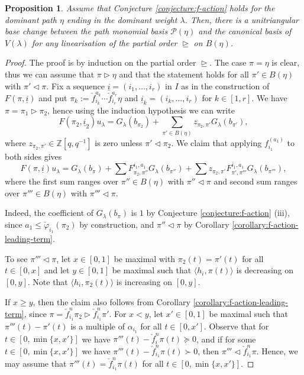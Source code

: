 \documentclass[final]{amsart}
\theoremstyle{plain}
\newtheorem{proposition}[corollary]{Proposition}
\theoremstyle{definition}
\newcommand{\calP}{\mathcal P}
\newcommand{\bbZ}{\mathbb Z}
\newcommand{\uli}{{\underline i}}
\newcommand{\cf}{\check{f}}
\newcommand{\cphi}{\check{\varphi}}
\begin{document}
\begin{proposition}
    \label{proposition:base-change-path-monomial-basis-canonical-basis}
    Assume that Conjecture \ref{conjecture:f-action} holds for the dominant path $\eta$ ending in the dominant weight $\lambda$.
    Then, there is a unitriangular base change between the path monomial basis $\calP(\eta)$ and the canonical basis of $V(\lambda)$ for any linearisation of the partial order $\trianglerighteq$ on $B(\eta)$.
\end{proposition}
\begin{proof}
    The proof is by induction on the partial order $\trianglerighteq$.
    The case $\pi = \eta$ is clear, thus we can assume that $\pi \triangleright \eta$ and that the statement holds for all $\pi' \in B(\eta)$ with $\pi' \triangleleft \pi$.
    Fix a sequence $\uli = (i_1, \dots, i_r)$ in $I$ as in the construction of $F(\pi, \uli)$ and put $\pi_k := \cf_{i_k}^{a_k} \cdots \cf_{i_r}^{a_r} \eta$ and $\uli_k = (i_k, \dots, i_r)$ for $k \in [1, r]$.
    We have $\pi = \pi_1 \triangleright \pi_2$, hence using the induction hypothesis we can write
    \[
        F(\pi_2, \uli_2) u_\lambda = G_\lambda(b_{\pi_2}) + \sum_{\pi' \in B(\eta)} z_{\pi_2, \pi'} G_\lambda(b_{\pi'}),
    \]
    where $z_{\pi_2, \pi'} \in \bbZ[q,q^{-1}]$ is zero unless $\pi' \triangleleft \pi_2$.
    We claim that applying $f_{i_1}^{(a_1)}$ to both sides gives
    \[
        F(\pi, \uli) u_\lambda = G_\lambda(b_\pi) + \sum F_{\pi_2,\pi''}^{i_1,a_1} G_\lambda(b_{\pi''}) + \sum z_{\pi_2, \pi'} F_{\pi',\pi'''}^{i_1,a_1} G_\lambda(b_{\pi'''}),
    \]
    where the first sum ranges over $\pi'' \in B(\eta)$ with $\pi'' \triangleleft \pi$ and second sum ranges over $\pi''' \in B(\eta)$ with $\pi''' \triangleleft \pi$.

    Indeed, the coefficient of $G_\lambda(b_\pi)$ is $1$ by Conjecture \ref{conjecture:f-action} (iii), since $a_1 \le \cphi_{i_1}(\pi_2)$ by construction, and $\pi'' \triangleleft \pi$ by Corollary \ref{corollary:f-action-leading-term}.

    To see $\pi''' \triangleleft \pi$, let $x \in [0, 1]$ be maximal with $\pi_2(t) = \pi'(t)$ for all $t \in [0, x]$ and let $y \in [0, 1]$ be maximal such that $\langle h_i, \pi(t)\rangle$ is decreasing on $[0, y]$.
    Note that $\langle h_i, \pi_2(t)\rangle$ is increasing on $[0, y]$.

    If $x \ge y$, then the claim also follows from Corollary \ref{corollary:f-action-leading-term}, since $\pi = \cf_{i_1}^n\pi_2 \triangleright \cf_{i_1}^n\pi'$.
    For $x < y$, let $x' \in [0, 1]$ be maximal such that $\pi'''(t) - \pi'(t)$ is a multiple of $\alpha_{i_1}$ for all $t \in [0, x']$.
    Observe that for $t \in [0, \min\{x, x'\}]$ we have $\pi'''(t) - \cf_i^n\pi(t) \succeq 0$, and if for some $t \in [0, \min\{x, x'\}]$ we have $\pi'''(t) - \cf_{i_1}^n\pi(t) \succ 0$, then $\pi''' \triangleleft \cf_{i_1}^n\pi$.
    Hence, we may assume that $\pi'''(t) = \cf_{i_1}^n\pi(t)$ for all $t \in [0, \min\{x, x'\}]$.


\end{proof}
\end{document}
